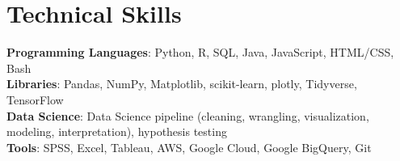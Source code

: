 \section{Technical Skills}
 \begin{itemize}[leftmargin=0.15in, label={}]
    \small{\item{
     \textbf{Programming Languages}{: Python, R, SQL, Java, JavaScript, HTML/CSS, Bash} \\
     \textbf{Libraries}{: Pandas, NumPy, Matplotlib, scikit-learn, plotly, Tidyverse, TensorFlow}\\
     \textbf{Data Science}{: Data Science pipeline (cleaning, wrangling, visualization, modeling, interpretation), hypothesis testing}\\
     \textbf{Tools}{: SPSS, Excel, Tableau, AWS, Google Cloud, Google BigQuery, Git}\\
    }}
 \end{itemize}